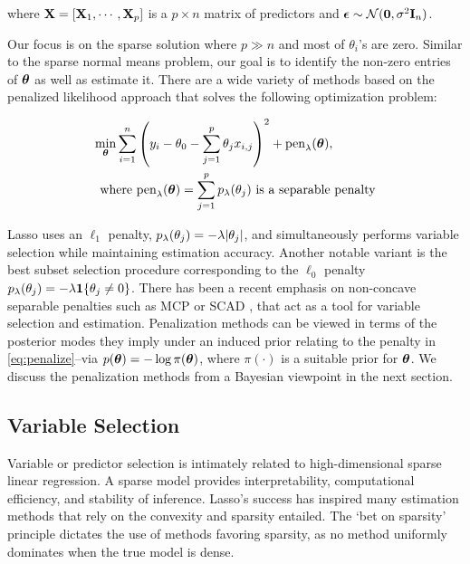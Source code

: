 \documentclass[sts,preprint]{imsart}
\begin{document}
where ${\bf X} = [{\bf X}_1, \cdots, {\bf X}_p]$ is a $p \times n$ matrix of predictors and $\boldsymbol{\epsilon} \sim {\cal N}({\bf 0}, \sigma^2{\bf I}_n)$. 

Our focus is on the sparse solution where $p \gg n$ and most of $\theta_i$'s are zero. Similar to the
sparse normal means problem, our goal is to identify the non-zero entries of $\boldsymbol{\theta}$ as well as estimate it. There are a wide variety of methods based on the penalized likelihood approach that solves the following optimization problem:

\begin{align}
  \min_{\boldsymbol{\theta}} \sum_{i=1}^{n} &  \left( y_i - \theta_0 - \sum_{j=1}^{p} \theta_j x_{i,j} \right)^2 + \text{pen}_{\lambda}(\boldsymbol{\theta}), \label{eq:penalize} \\
  \text{where } & \text{pen}_{\lambda}(\boldsymbol{\theta}) = \sum_{j=1}^{p} p_{\lambda}(\theta_j) \text{ is a separable penalty} \nonumber
\end{align}

Lasso uses an $\ell_1$ penalty, $p_{\lambda}(\theta_j) = -\lambda \lvert\theta_j\rvert$, and simultaneously performs variable selection while maintaining estimation accuracy.  Another notable variant is the best subset selection procedure corresponding to the $\ell_0$ penalty $p_{\lambda}(\theta_j) = -\lambda {\bf 1}\{\theta_j \ne 0\}$.
There has been a recent emphasis on non-concave separable penalties such as MCP \citep{zhang2010nearly} or SCAD \citep{fan2001variable}, that act as a tool for variable selection and estimation. Penalization methods can be viewed in terms of the posterior modes they imply under an induced prior relating to the penalty in \eqref{eq:penalize}--via $p(\boldsymbol{\theta}) = -\log \pi(\boldsymbol{\theta})$, where $\pi(\cdot)$ is a suitable prior for $\boldsymbol{\theta}$. We discuss the penalization methods from a Bayesian viewpoint in the next section. 


\subsection{Variable Selection}


Variable or predictor selection is intimately related to high-dimensional sparse linear regression.  A sparse model provides interpretability, computational efficiency, and stability of inference. Lasso's success has inspired many estimation methods that rely on the convexity and sparsity entailed. The `bet on sparsity' principle \citep{hastie_elements_2009} dictates the use of methods favoring sparsity, as no method uniformly dominates when the true model is dense.  
\end{document}

